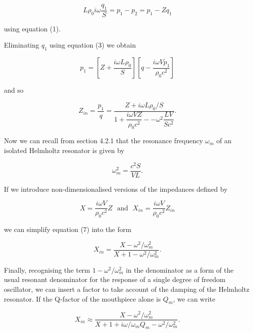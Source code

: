   \begin{equation*}L \rho_0 i \omega \dfrac{q_1}{S}=p_1-p_2 = p_1 -Zq_1 
  \tag{5}\end{equation*} 

  \noindent{}using equation (1). 

  Eliminating $q_1$ using equation (3) we obtain 

  \begin{equation*}p_1=\left[ Z+\dfrac{i \omega L \rho_0}{S} \right] \left[ 
  q-\dfrac{i \omega V p_1}{\rho_0 c^2} \right] \tag{6}\end{equation*} 

  \noindent{}and so 

  \begin{equation*}Z_{in} =\dfrac{p_1}{q}=\dfrac{Z+i \omega L \rho_0/S}{1+ 
  \dfrac{i \omega V Z}{\rho_0 c^2} -- \omega^2 \dfrac{LV}{Sc^2}} . 
  \tag{7}\end{equation*} 

  Now we can recall from section 4.2.1 that the resonance frequency $\omega_m$ 
  of an isolated Helmholtz resonator is given by 

  \begin{equation*}\omega_m^2 =\dfrac{c^2S}{VL} . \tag{8}\end{equation*} 

  If we introduce non-dimensionalised versions of the impedances defined by 

  \begin{equation*}X=\dfrac{i \omega V}{\rho_0 c^2}Z \mathrm{~~~and~~~} 
  X_{in}=\dfrac{i \omega V}{\rho_0 c^2}Z_{in} \tag{9}\end{equation*} 

  \noindent{}we can simplify equation (7) into the form 

  
  \begin{equation*}X_{in}=\dfrac{X-\omega^2/\omega_m^2}{X+1-\omega^2/\omega_m^2}. 
  \tag{10}\end{equation*} 

  Finally, recognising the term $1-\omega^2/\omega_m^2$ in the denominator as a 
  form of the usual resonant denominator for the response of a single degree of 
  freedom oscillator, we can insert a factor to take account of the damping of 
  the Helmholtz resonator. If the Q-factor of the mouthpiece alone is $Q_m$, we 
  can write 

  \begin{equation*}X_{in} \approx \dfrac{X-\omega^2/\omega_m^2}{X+1+i 
  \omega/\omega_m Q_m-\omega^2/\omega_m^2}. \tag{11}\end{equation*} 


